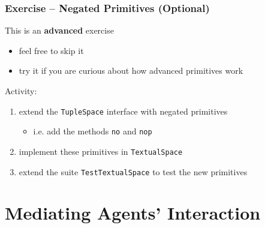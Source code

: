 \documentclass[presentation]{beamer}\mode<presentation>{\usetheme{AMSCesenaPurpleAndGold}}
\begin{document}
\begin{frame}[allowframebreaks]
	\frametitle{Exercise \currentExercise{} -- Negated Primitives (Optional)}
	
	\begin{alertblock}{This is an \textbf{advanced} exercise}
		\begin{itemize}
			\item feel free to skip it
			\item try it if you are curious about how advanced primitives work
		\end{itemize}
	\end{alertblock}
	
	\bigskip
	
	Activity:
	\medskip
	\begin{enumerate}
		\item extend the \texttt{TupleSpace} interface with \alert{negated} primitives
		\begin{itemize}
			\item i.e. add the methods \texttt{no} and \texttt{nop}
		\end{itemize}
		
		\medskip
		
		\item implement these primitives in \texttt{TextualSpace}
		
		\medskip
		
		\item extend the suite \texttt{TestTextualSpace} to test the new primitives
		
	\end{enumerate}
	
\end{frame}

\section{Mediating Agents' Interaction}
\end{document}
